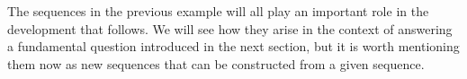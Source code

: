 \documentclass{ximera}
\begin{document}
\begin{remark}
The sequences in the previous example will all play an important role in the development that follows.  We will see how they arise in the context of answering a fundamental question introduced in the next section, but it is worth mentioning them now as new sequences that can be constructed from a given sequence.
\end{remark}

%
%
%
%
\end{document}
